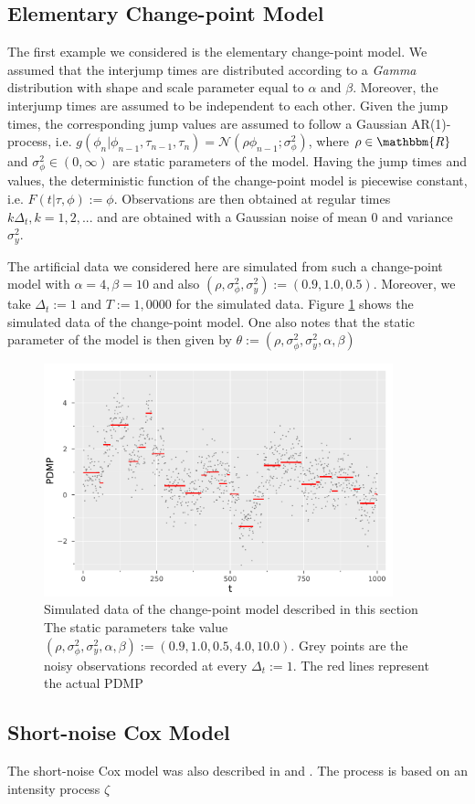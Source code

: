 \documentclass[12pt,a4paper]{article}
\begin{document}
\subsection{Elementary Change-point Model}
The first example we considered is the elementary change-point model. We assumed that the interjump times are distributed according to a \textit{Gamma} distribution with shape and scale parameter equal to \(\alpha\) and \(\beta\). Moreover, the interjump times are assumed to be independent to each other. Given the jump times, the corresponding jump values are assumed to follow a Gaussian AR(1)-process, i.e. \(g(\phi_n|\phi_{n-1},\tau_{n-1},\tau_n) = \mathcal{N}(\rho\phi_{n-1};\sigma_{\phi}^2)\), where \(\rho \in \mathbbm{R}\) and \(\sigma_{\phi}^2 \in (0,\infty)\) are static parameters of the model. Having the jump times and values, the deterministic function of the change-point model is piecewise constant, i.e. \(F(t|\tau,\phi):= \phi\). Observations are then obtained at regular times \(k\Delta_t, k= 1,2,...\) and are obtained with a Gaussian noise of mean \(0\) and variance \(\sigma_y^2\). 

The artificial data we considered here are simulated from such a change-point model with \(\alpha=4,\beta=10\) and also \((\rho,\sigma_\phi^2,\sigma^2_y):= (0.9,1.0,0.5)\). Moreover, we take \(\Delta_t := 1\) and \(T:=1,0000\) for the simulated data. Figure \ref{Fig:Changpoint Data} shows the simulated data of the change-point model. One also notes that the static parameter of the model is then given by \(\theta:= (\rho,\sigma_\phi^2,\sigma_y^2,\alpha,\beta)\)
\begin{figure}[t!]
    \centering
    \includegraphics[width=0.9\textwidth]{CP_data.pdf}
    \caption{Simulated data of the change-point model described in this section The static parameters take value \((\rho,\sigma_\phi^2,\sigma_y^2,\alpha,\beta):=(0.9,1.0,0.5,4.0,10.0)\). Grey points are the noisy observations recorded at every \(\Delta_t := 1\). The red lines represent the actual PDMP}
    \label{Fig:Changpoint Data}
\end{figure}
\subsection{Short-noise Cox Model}
The short-noise Cox model was also described in \cite{finke2014static} and \cite{whiteley2011monte}. The process is based on an intensity process \(\zeta\)
\newpage


\end{document}
